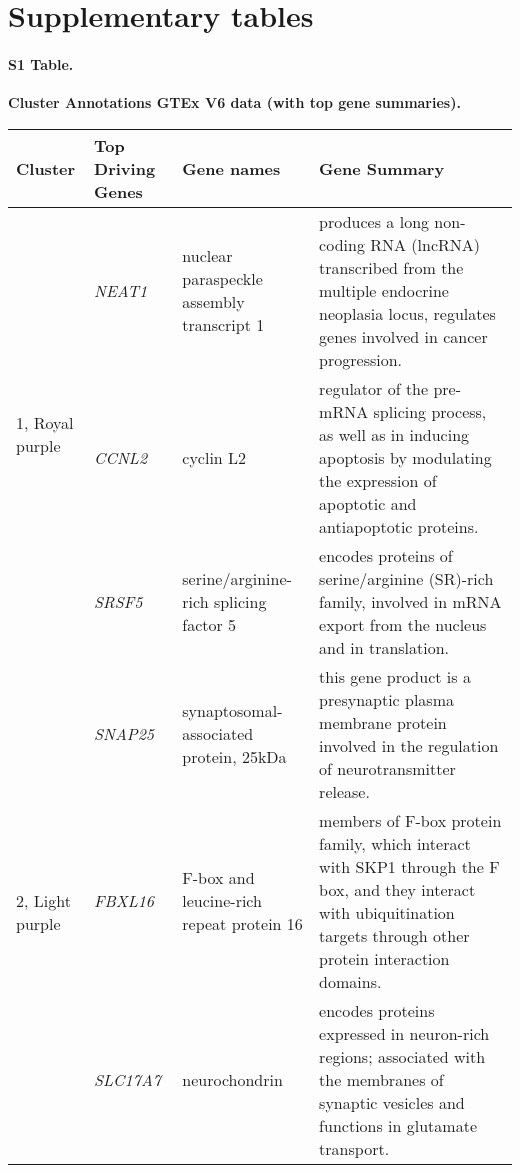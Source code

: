 \clearpage
\section{Supplementary tables}
\paragraph*{S1 Table.}
\label{supptab1}
{\bf Cluster Annotations GTEx V6 data (with top gene summaries).}


\begin{table}[!hp]
\begin{adjustwidth}{-.5in}{0in}
\begin{tabular}{|p{0.6in}|p{0.6in}|p{1.3 in}|p{3.8in}|}
\hline
Cluster & Top Driving \qquad Genes & Gene names  & Gene Summary \\
\hline
\multirow{3}{4em}{\scriptsize{1, Royal purple} } &  \small{\textit{NEAT1}} & \scriptsize{nuclear paraspeckle assembly transcript 1} & \scriptsize{produces a long non-coding RNA (lncRNA) transcribed from the multiple endocrine neoplasia locus, regulates genes involved in cancer progression.}\\ 
				& \small{\textit{CCNL2}} & \scriptsize{cyclin L2} & \scriptsize{regulator of the pre-mRNA splicing process, as well as in inducing apoptosis by modulating the expression of apoptotic and antiapoptotic proteins.}\\
				& \small{\textit{SRSF5}} & \scriptsize{serine/arginine-rich splicing factor 5} & \scriptsize{encodes proteins of serine/arginine (SR)-rich family,  involved in mRNA export from the nucleus and in translation.}\\
\hline
 \multirow{3}{4em}{\scriptsize{2, Light purple} } & \small{\textit{SNAP25}}  & \scriptsize{synaptosomal-associated protein, 25kDa} & \scriptsize{this gene product is a presynaptic plasma membrane protein involved in the regulation of neurotransmitter release.} \\
 					&  \small{\textit{FBXL16}}  & \scriptsize{F-box and leucine-rich repeat protein 16} & \scriptsize{members of F-box protein family, which interact with SKP1 through the F box, and they interact with ubiquitination targets through other protein interaction domains.} \\
					&  \small{\textit{SLC17A7}}  & \scriptsize{neurochondrin} & \scriptsize{encodes proteins expressed in neuron-rich regions; associated with the membranes of synaptic vesicles and functions in glutamate transport.} \\
\hline

\end{tabular}
\end{adjustwidth}
\end{table}

